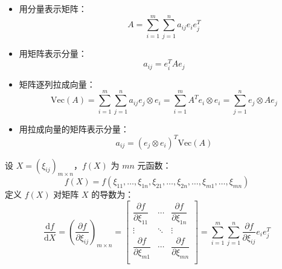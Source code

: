 \begin{itemize}
    \item 用分量表示矩阵：
    \[
        A=\sum_{i=1}^m\sum_{j=1}^na_{ij}e_ie_j^T
    \]

    \item 用矩阵表示分量：
    \[
        a_{ij}=e_i^TAe_j
    \]

    \item 矩阵逐列拉成向量：
    \[
        \text{Vec}(A)=\sum_{i=1}^m\sum_{j=1}^na_{ij}e_j\otimes e_i=\sum_{i=1}^mA^T e_i\otimes e_i=\sum_{j=1}^ne_j\otimes Ae_j
    \]

    \item 用拉成向量的矩阵表示分量：
    \[
        a_{ij}=(e_j\otimes e_i)^T\text{Vec}(A)
    \]
\end{itemize}

\begin{definition}[函数矩阵的导数]
设 $X=(\xi_{ij})_{m\times n}$，$f(X)$ 为 $mn$ 元函数：
\[
    f(X)=f(\xi_{11},\ldots,\xi_{1n},\xi_{21},\ldots,\xi_{2n},\ldots,\xi_{m1},\ldots,\xi_{mn})
\]
定义 $f(X)$ 对矩阵 $X$ 的导数为：
\[
    \frac{\mathrm df}{\mathrm dX}=\left(\frac{\partial f}{\partial \xi_{ij}}\right)_{m\times n}=
    \begin{bmatrix}
    \dfrac{\partial f}{\partial \xi_{11}}&\cdots&\dfrac{\partial f}{\partial \xi_{1n}}\\
    \vdots&\ddots&\vdots\\
    \dfrac{\partial f}{\partial \xi_{m1}}&\cdots&\dfrac{\partial f}{\partial \xi_{mn}}\\
    \end{bmatrix}
    =\sum_{i=1}^m\sum_{j=1}^n\frac{\partial f}{\partial \xi_{ij}}e_ie_j^T
\]
\end{definition}

